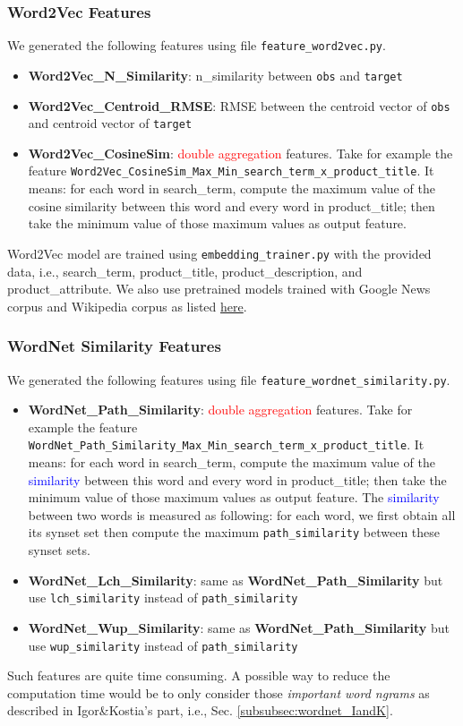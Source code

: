 \documentclass[12pt]{article}
\begin{document}
\subsubsection{Word2Vec Features}
We generated the following features using file \texttt{feature\_word2vec.py}.
\begin{itemize}
\item \textbf{Word2Vec\_N\_Similarity}: n\_similarity between \texttt{obs} and \texttt{target}
\item \textbf{Word2Vec\_Centroid\_RMSE}: RMSE between the centroid vector of \texttt{obs} and centroid vector of \texttt{target}
\item \textbf{Word2Vec\_CosineSim}: \textcolor{red}{double aggregation} features. Take for example the feature \texttt{Word2Vec\_CosineSim\_Max\_Min\_search\_term\_x\_product\_title}. It means: for each word in search\_term, compute the maximum value of the cosine similarity between this word and every word in product\_title; then take the minimum value of those maximum values as output feature.
\end{itemize}
Word2Vec model are trained using \texttt{embedding\_trainer.py} with the provided data, i.e., search\_term, product\_title, product\_description, and product\_attribute. We also use pretrained models trained with Google News corpus and Wikipedia corpus as listed \href{https://github.com/3Top/word2vec-api}{here}.

\subsubsection{WordNet Similarity Features}
\label{subsec:wordnet}
We generated the following features using file \texttt{feature\_wordnet\_similarity.py}.
\begin{itemize}
\item \textbf{WordNet\_Path\_Similarity}: \textcolor{red}{double aggregation} features. Take for example the feature \texttt{WordNet\_Path\_Similarity\_Max\_Min\_search\_term\_x\_product\_title}. It means: for each word in search\_term, compute the maximum value of the \textcolor{blue}{similarity} between this word and every word in product\_title; then take the minimum value of those maximum values as output feature. The \textcolor{blue}{similarity} between two words is measured as following: for each word, we first obtain all its synset set then compute the maximum \texttt{path\_similarity} between these synset sets.
\item \textbf{WordNet\_Lch\_Similarity}: same as \textbf{WordNet\_Path\_Similarity} but use \texttt{lch\_similarity} instead of \texttt{path\_similarity}
\item \textbf{WordNet\_Wup\_Similarity}: same as \textbf{WordNet\_Path\_Similarity} but use \texttt{wup\_similarity} instead of \texttt{path\_similarity}
\end{itemize}
Such features are quite time consuming. A possible way to reduce the computation time would be to only consider those \emph{important word ngrams} as described in Igor\&Kostia's part, i.e., Sec. \ref{subsubsec:wordnet_IandK}.
\end{document}

